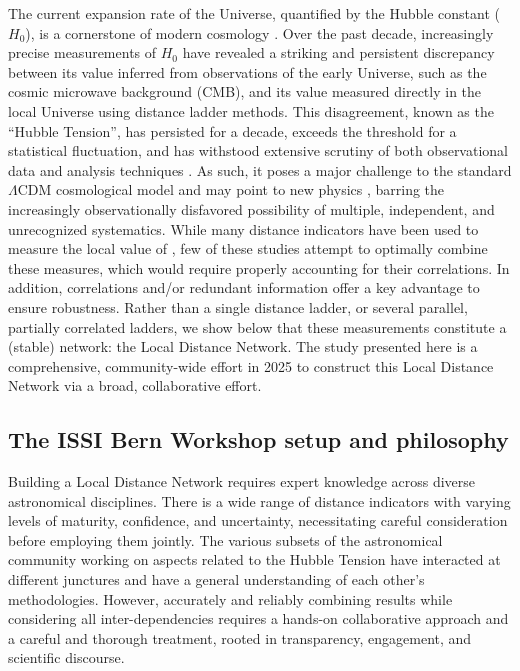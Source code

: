 The current expansion rate of the Universe, quantified by the Hubble constant ($H_0$), is a cornerstone of modern cosmology \citep[see reviews by][and references therein]{1992PASP..104..599J,2010ARA&A..48..673F}. Over the past decade, increasingly precise measurements of $H_0$ have revealed a striking and persistent discrepancy between its value inferred from observations of the early Universe, such as the cosmic microwave background (CMB), and its value measured directly in the local Universe using distance ladder methods. This disagreement, known as the ``Hubble Tension'', has persisted for a decade, exceeds the threshold for a statistical fluctuation, and has withstood extensive scrutiny of both observational data and analysis techniques \citep[see][for recent reviews]{2019NatAs...3..891V, 2021A&ARv..29....9S,2023ARNPS..73..153K,Verde2024}. 
As such, it poses a major challenge to the standard $\Lambda$CDM cosmological model and may point to new physics \citep[see][]{2021CQGra..38o3001D,CosmoVerse:2025txj}, barring the increasingly observationally disfavored possibility of multiple, independent, and unrecognized systematics. While many distance indicators have been used to measure the local value of {\Hcst}, few of these studies attempt to optimally combine these measures, which would require properly accounting for their correlations. In addition, correlations and/or redundant information offer a key advantage to ensure robustness.  Rather than a single distance ladder, or several parallel, partially correlated ladders, we show below that these measurements constitute a (stable) network: the Local Distance Network.  The study presented here is a comprehensive, community-wide effort in 2025 to construct this Local Distance Network via a broad, collaborative effort.


\subsection{The ISSI Bern Workshop setup and philosophy\label{sec:philosophy}}

Building a Local Distance Network requires expert knowledge across diverse astronomical disciplines. There is a wide range of distance indicators with varying levels of maturity, confidence, and uncertainty, necessitating careful consideration before employing them jointly. The various subsets of the astronomical community working on aspects related to the Hubble Tension have interacted at different junctures and have a general understanding of each other's methodologies. However, accurately and reliably combining results while considering all inter-dependencies requires a hands-on collaborative approach and a careful and thorough treatment, rooted in transparency, engagement, and scientific discourse. 

